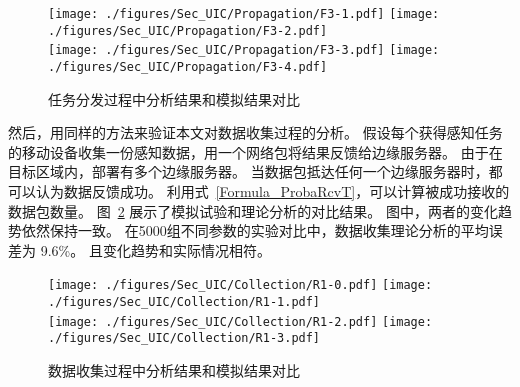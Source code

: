 \begin{figure}[!h]
  \centering
  {\texttt{[image: ./figures/Sec\_UIC/Propagation/F3-1.pdf]}}
  {\texttt{[image: ./figures/Sec\_UIC/Propagation/F3-2.pdf]}}\\
  {\texttt{[image: ./figures/Sec\_UIC/Propagation/F3-3.pdf]}}
  {\texttt{[image: ./figures/Sec\_UIC/Propagation/F3-4.pdf]}}
  \vspace{-0.5em}
  \caption{任务分发过程中分析结果和模拟结果对比}
  \vspace{-0.5em}
  \label{Figure_PropagationTest}
\end{figure}








然后，用同样的方法来验证本文对数据收集过程的分析。
假设每个获得感知任务的移动设备收集一份感知数据，用一个网络包将结果反馈给边缘服务器。
由于在目标区域内，部署有多个边缘服务器。
当数据包抵达任何一个边缘服务器时，都可以认为数据反馈成功。
利用式~\eqref{Formula_ProbaRcvT}，可以计算被成功接收的数据包数量。
图~\ref{Figure_CollectionTest} 展示了模拟试验和理论分析的对比结果。
图中，两者的变化趋势依然保持一致。
在5000组不同参数的实验对比中，数据收集理论分析的平均误差为 9.6\%。
且变化趋势和实际情况相符。

\begin{figure}[!t]
  \centering
  {\texttt{[image: ./figures/Sec\_UIC/Collection/R1-0.pdf]}}
  {\texttt{[image: ./figures/Sec\_UIC/Collection/R1-1.pdf]}}\\
  {\texttt{[image: ./figures/Sec\_UIC/Collection/R1-2.pdf]}}
  {\texttt{[image: ./figures/Sec\_UIC/Collection/R1-3.pdf]}}
  \vspace{-0.5em}
  \caption{数据收集过程中分析结果和模拟结果对比}
  \vspace{-1em}
  \label{Figure_CollectionTest}
\end{figure}

